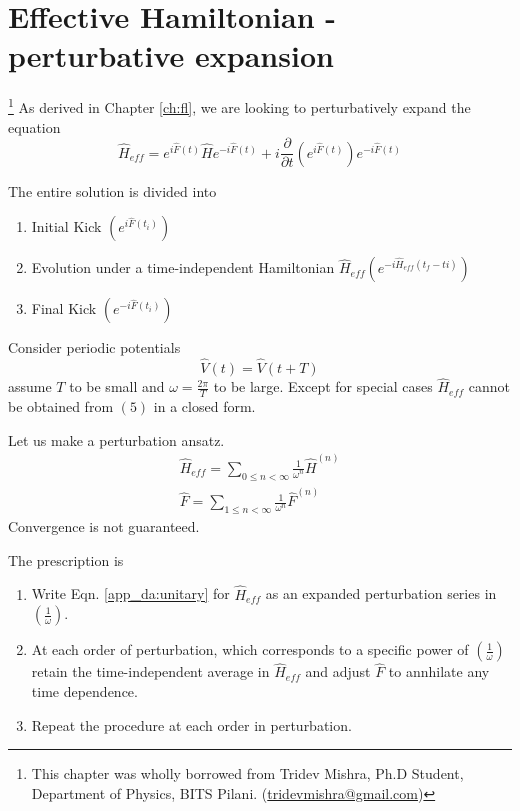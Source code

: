 \chapter{Effective Hamiltonian - perturbative expansion}\footnote{This chapter was wholly borrowed from Tridev Mishra, Ph.D Student, Department of Physics, BITS Pilani. (\url{tridevmishra@gmail.com})}
As derived in Chapter \ref{ch:fl}, we are looking to perturbatively expand the equation
\begin{equation}
 \label{app_da:unitary}\hat{H}_{eff}= e^{i\hat{F}(t)}\hat{H}e^{-i\hat{F}(t)} + i\frac{\partial}{\partial t}\left(e^{i\hat{F}(t)}\right)e^{-i\hat{F}(t)}
\end{equation}

The entire solution is divided into 
 \begin{enumerate}
  \item Initial Kick $(e^{i\hat{F}(t_{i})})$
  
  \item Evolution under a time-independent Hamiltonian $\hat{H}_{eff} (e^{-i\hat{H}_{eff}(t_{f}-t{i})})$
  
  \item Final Kick $(e^{-i\hat{F}(t_{i})})$
 \end{enumerate}
 Consider periodic potentials
 \begin{equation*}
  \hat{V}(t) = \hat{V}(t+T)
 \end{equation*}
 assume $T$ to be small and $\omega = \frac{2\pi}{T}$ to be large. Except for special cases $\hat{H}_{eff}$ cannot be obtained 
 from $(5)$ in a closed form.
 
 Let us make a perturbation ansatz.
 \begin{gather}
   \hat{H}_{eff}=\displaystyle\sum_{0\leq n< \infty}\frac{1}{\omega^{n}}\hat{H}^{(n)} \\
   \hat{F}= \displaystyle\sum_{1\leq n< \infty}\frac{1}{\omega^{n}}\hat{F}^{(n)}
 \end{gather} 
 Convergence is not guaranteed.
 
 The prescription is
 \begin{enumerate}
  \item Write Eqn. \eqref{app_da:unitary} for $\hat{H}_{eff}$ as an expanded perturbation series in $(\frac{1}{\omega})$.
  
  \item At each order of perturbation, which corresponds to a specific power of $(\frac{1}{\omega})$ retain the time-independent
  average in $\hat{H}_{eff}$ and adjust $\hat{F}$ to annhilate any time dependence.
  
  \item Repeat the procedure at each order in perturbation.
 \end{enumerate}

